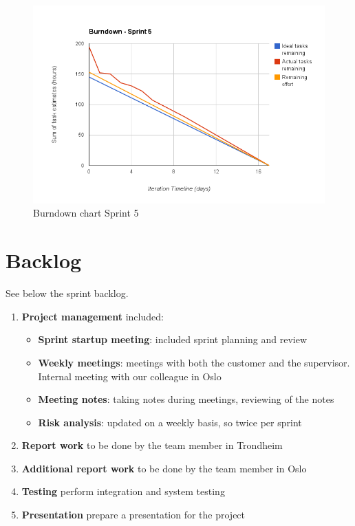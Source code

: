 \begin{figure}[h]
\centering
\includegraphics[scale=0.60]{../Figures/burndownSprint5.png}
\caption{Burndown chart Sprint 5}
\label{figure:burndownsprint5}
\end{figure}

\section{Backlog}
See below the sprint backlog.
\begin{enumerate}[1.]
\item \textbf{Project management} included:
	\begin{itemize}
		\item \textbf{Sprint startup meeting}:
			included sprint planning and review
		\item \textbf{Weekly meetings}: 
			meetings with both the customer and the supervisor. Internal meeting with our colleague in Oslo
		\item \textbf{Meeting notes}:
			taking notes during meetings, reviewing of the notes
		\item \textbf{Risk analysis}:
			updated on a weekly basis, so twice per sprint
	\end{itemize}
	\item \textbf{Report work}
		to be done by the team member in Trondheim
	\item \textbf{Additional report work}
		to be done by the team member in Oslo
	\item \textbf{Testing}
		perform integration and system testing
	\item \textbf{Presentation}
		prepare a presentation for the project
\end{enumerate}

